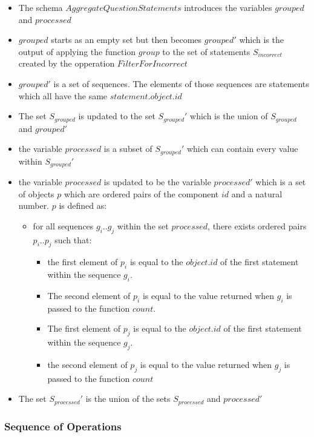 \documentclass{article}
\begin{document}
\begin{itemize}
\item The schema $AggregateQuestionStatements$ introduces the variables
  $grouped$ and $processed$
\item $grouped$ starts as an empty set but then becomes $grouped'$
  which is the output of applying the function $group$ to the set of statements
  $S_{incorrect}$ created by the opperation $FilterForIncorrect$
\item $grouped'$ is a set of sequences. The elements of those
  sequences are statements which all have the same $statement.object.id$
\item The set $S_{grouped}$ is updated to the set $S_{grouped}'$ which
  is the union of $S_{grouped}$ and $grouped'$
\item the variable $processed$ is a subset of $S_{grouped}'$ which can
  contain every value within $S_{grouped}'$
\item the variable $processed$ is updated to be the variable
  $processed'$ which is a set of objects $p$ which are ordered pairs
  of the component $id$ and a natural number. $p$ is defined as:
  \begin{itemize}
  \item for all sequences $g_{i}..g_{j}$ within the set $processed$,
    there exists ordered pairs $p_{i}..p_{j}$ such that:
    \begin{itemize}
    \item the first element of $p_{i}$ is equal to the $object.id$ of the first
      statement within the sequence $g_{i}$.
    \item The second element of $p_{i}$ is equal to the value returned
      when $g_{i}$ is passed to the function $count$.
    \item The first element of $p_{j}$ is equal to the $object.id$ of the
      first statement within the sequence $g_{j}$.
    \item the second element of $p_{j}$ is equal to the value returned
      when $g_{j}$ is passed to the function $count$
    \end{itemize}
  \end{itemize}
  \item The set $S_{processed}'$ is the union of the sets
    $S_{processed}$ and $processed'$
\end{itemize}

\subsubsection{Sequence of Operations}
\end{document}
